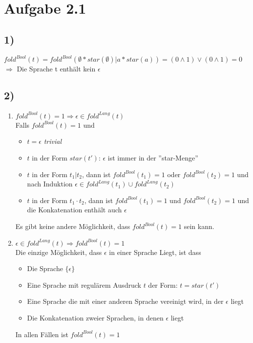 \section*{Aufgabe 2.1}
\subsection*{1)}
$fold^{Bool}(t) =
fold^{Bool}(\emptyset * star(\emptyset) | a * star(a)) = 
(0 \wedge 1) \vee (0 \wedge 1) = 0$ \\
$\Rightarrow$ Die Sprache t enthält kein $\epsilon$
\subsection*{2)}
\begin{enumerate}
    \item $fold^{Bool}(t)=1\Rightarrow\epsilon\in fold^{Lang}(t)$\\ 
    Falls $fold^{Bool}(t)=1$ und
    \begin{itemize}
        \item $t=\epsilon$ \textit{trivial}
        \item $t$ in der Form $star(t')$: $\epsilon$ ist immer in der ''star-Menge''
        \item $t$ in der Form $t_1 | t_2$, dann ist 
        $fold^{Bool}(t_1)=1$ oder $fold^{Bool}(t_2)=1$ und nach Induktion $\epsilon\in fold^{Lang}(t_1)\cup fold^{Lang}(t_2)$
        \item $t$ in der Form $t_1 \cdot t_2$, dann ist $fold^{Bool}(t_1)=1$ und $fold^{Bool}(t_2)=1$ und die Konkatenation enthält auch $\epsilon$
    \end{itemize}
    Es gibt keine andere Möglichkeit, dass $fold^{Bool}(t)=1$ sein kann.
    \item $\epsilon\in fold^{Lang}(t) \Rightarrow fold^{Bool}(t)=1$\\
    Die einzige Möglichkeit, dass $\epsilon$ in einer Sprache Liegt, ist dass
    \begin{itemize}
        \item Die Sprache $\{\epsilon\}$
        \item Eine Sprache mit regulärem Ausdruck $t$ der Form: $t=star(t')$
        \item Eine Sprache die mit einer anderen Sprache vereinigt wird, in der $\epsilon$ liegt
        \item Die Konkatenation zweier Sprachen, in denen $\epsilon$ liegt
    \end{itemize}
    In allen Fällen ist $fold^{Bool}(t)=1$
\end{enumerate}
